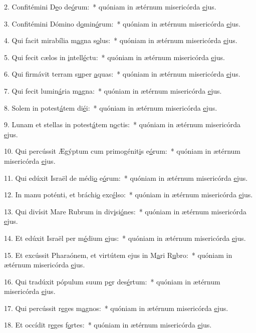 2. Confitémini D\uline{e}o de\uline{ó}rum:~* quóniam in ætérnum misericórda \uline{e}jus.\par 
3. Confitémini Dómino d\uline{o}min\uline{ó}rum:~* quóniam in ætérnum misericórda \uline{e}jus.\par 
4. Qui facit mirabília m\uline{a}gna s\uline{o}lus:~* quóniam in ætérnum misericórda \uline{e}jus.\par 
5. Qui fecit cælos in \uline{i}ntell\uline{é}ctu:~* quóniam in ætérnum misericórda \uline{e}jus.\par 
6. Qui firmávit terram s\uline{u}per \uline{a}quas:~* quóniam in ætérnum misericórda \uline{e}jus.\par 
7. Qui fecit lumin\uline{á}ria m\uline{a}gna:~* quóniam in ætérnum misericórda \uline{e}jus.\par 
8. Solem in potest\uline{á}tem di\uline{é}i:~* quóniam in ætérnum misericórda \uline{e}jus.\par 
9. Lunam et stellas in potest\uline{á}tem n\uline{o}ctis:~* quóniam in ætérnum misericórda \uline{e}jus.\par 
10. Qui percússit Ægýptum cum primogénit\uline{i}s e\uline{ó}rum:~* quóniam in ætérnum misericórda \uline{e}jus.\par 
11. Qui edúxit Israël de médi\uline{o} e\uline{ó}rum:~* quóniam in ætérnum misericórda \uline{e}jus.\par 
12. In manu poténti, et bráchi\uline{o} exc\uline{é}lso:~* quóniam in ætérnum misericórda \uline{e}jus.\par 
13. Qui divísit Mare Rubrum in div\uline{i}si\uline{ó}nes:~* quóniam in ætérnum misericórda \uline{e}jus.\par 
14. Et edúxit Israël per m\uline{é}dium \uline{e}jus:~* quóniam in ætérnum misericórda \uline{e}jus.\par 
15. Et excússit Pharaónem, et virtútem ejus in M\uline{a}ri R\uline{u}bro:~* quóniam in ætérnum misericórda \uline{e}jus.\par 
16. Qui tradúxit pópulum suum p\uline{e}r des\uline{é}rtum:~* quóniam in ætérnum misericórda \uline{e}jus.\par 
17. Qui percússit r\uline{e}ges m\uline{a}gnos:~* quóniam in ætérnum misericórda \uline{e}jus.\par 
18. Et occídit r\uline{e}ges f\uline{o}rtes:~* quóniam in ætérnum misericórda \uline{e}jus.\par 
